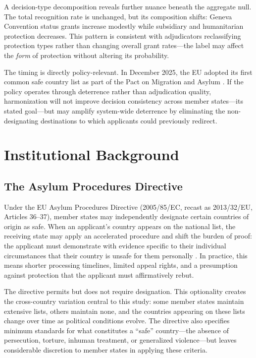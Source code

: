 \documentclass[12pt]{article}
\begin{document}
A decision-type decomposition reveals further nuance beneath the aggregate null. The total recognition rate is unchanged, but its composition shifts: Geneva Convention status grants increase modestly while subsidiary and humanitarian protection decreases. This pattern is consistent with adjudicators reclassifying protection types rather than changing overall grant rates---the label may affect the \textit{form} of protection without altering its probability.

The timing is directly policy-relevant. In December 2025, the EU adopted its first common safe country list as part of the Pact on Migration and Asylum \citep{eucouncil2025pact}. If the policy operates through deterrence rather than adjudication quality, harmonization will not improve decision consistency across member states---its stated goal---but may amplify system-wide deterrence by eliminating the non-designating destinations to which applicants could previously redirect.

\section{Institutional Background}

\subsection{The Asylum Procedures Directive}

Under the EU Asylum Procedures Directive (2005/85/EC, recast as 2013/32/EU, Articles 36--37), member states may independently designate certain countries of origin as safe. When an applicant's country appears on the national list, the receiving state may apply an accelerated procedure and shift the burden of proof: the applicant must demonstrate with evidence specific to their individual circumstances that their country is unsafe for them personally \citep{euaa2023guidance}. In practice, this means shorter processing timelines, limited appeal rights, and a presumption against protection that the applicant must affirmatively rebut.

The directive permits but does not require designation. This optionality creates the cross-country variation central to this study: some member states maintain extensive lists, others maintain none, and the countries appearing on these lists change over time as political conditions evolve. The directive also specifies minimum standards for what constitutes a ``safe'' country---the absence of persecution, torture, inhuman treatment, or generalized violence---but leaves considerable discretion to member states in applying these criteria.
\end{document}
